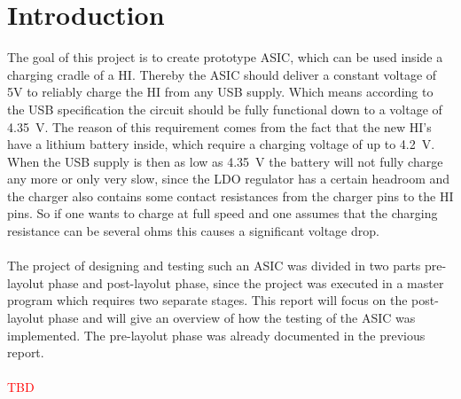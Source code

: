\section{Introduction}
\label{chap:introduction}
The goal of this project is to create prototype \ac{ASIC}, which can be used inside a charging cradle of a \ac{HI}. Thereby the \ac{ASIC} should deliver a constant voltage of 5V to reliably charge the \ac{HI} from any \ac{USB} supply. Which means according to the \ac{USB} specification the circuit should be fully functional down to a voltage of \qty{4.35}{\volt}. The reason of this requirement comes from the fact that the new \ac{HI}'s have a lithium battery inside, which require a charging voltage of up to \qty{4.2}{\volt}. When the \ac{USB} supply is then as low as \qty{4.35}{\volt} the battery will not fully charge any more or only very slow, since the \ac{LDO} regulator has a certain headroom and the charger also contains some contact resistances from the charger pins to the \ac{HI} pins. So if one wants to charge at full speed and one assumes that the charging resistance can be several ohms this causes a significant voltage drop. \cite{analog_devices_usb_charging} \\\\
The project of designing and testing such an \ac{ASIC} was divided in two parts \glqq pre-layolut phase\grqq{} and \glqq post-layolut phase\grqq{}, since the project was executed in a master program which requires two separate stages. This report will focus on the \glqq post-layolut phase\grqq{} and will give an overview of how the testing of the \ac{ASIC} was implemented. The \glqq pre-layolut phase\grqq{} was already documented in the previous report. \\\\
\textcolor{red}{TBD}
\clearpage